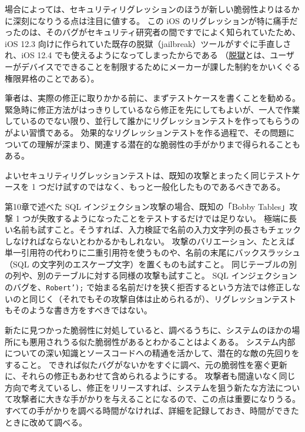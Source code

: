 \documentclass[uplatex]{jsarticle}
\def\label#1{}%
\begin{document}
場合によっては、セキュリティリグレッションのほうが新しい脆弱性よりはるかに深刻になりうる点は注目に値する。
この iOS のリグレッションが特に痛手だったのは、そのバグがセキュリティ研究者の間ですでによく知られていたため、iOS 12.3 向けに作られていた既存の脱獄（jailbreak）ツールがすぐに手直しされ、iOS 12.4 でも使えるようになってしまったからである
（\underline{脱獄}とは、ユーザーがデバイスでできることを制限するためにメーカーが課した制約をかいくぐる権限昇格のことである）。

筆者は、実際の修正に取りかかる前に、まずテストケースを書くことを勧める。
緊急時に修正方法がはっきりしているなら修正を先にしてもよいが、一人で作業しているのでない限り、並行して誰かにリグレッションテストを作ってもらうのがよい習慣である。
効果的なリグレッションテストを作る過程で、その問題についての理解が深まり、関連する潜在的な脆弱性の手がかりまで得られることもある。

よいセキュリティリグレッションテストは、既知の攻撃とまったく同じテストケースを 1 つだけ試すのではなく、もっと一般化したものであるべきである。

\begin{exa}\label{exa:ch12-sql-injection-regression}
第10章で述べた SQL インジェクション攻撃の場合、既知の「Bobby Tables」攻撃 1 つが失敗するようになったことをテストするだけでは足りない。
極端に長い名前も試すこと。そうすれば、入力検証で名前の入力文字列の長さもチェックしなければならないとわかるかもしれない。
攻撃のバリエーション、たとえば単一引用符の代わりに二重引用符を使うものや、名前の末尾にバックスラッシュ（SQL の文字列のエスケープ文字）を置くものも試すこと。
同じテーブルの別の列や、別のテーブルに対する同様の攻撃も試すこと。
SQL インジェクションのバグを、\texttt{Robert');} で始まる名前だけを狭く拒否するという方法では修正しないのと同じく（それでもその攻撃自体は止められるが）、リグレッションテストもそのような書き方をすべきではない。
\end{exa}

新たに見つかった脆弱性に対処していると、調べるうちに、システムのほかの場所にも悪用されうる似た脆弱性があるとわかることはよくある。
システム内部についての深い知識とソースコードへの精通を活かして、潜在的な敵の先回りをすること。
できれば似たバグがないかをすぐに調べ、元の脆弱性を塞ぐ更新に、それらの修正もあわせて含められるようにする。
攻撃者も間違いなく同じ方向で考えているし、修正をリリースすれば、システムを狙う新たな方法について攻撃者に大きな手がかりを与えることになるので、この点は重要になりうる。
すべての手がかりを調べる時間がなければ、詳細を記録しておき、時間ができたときに改めて調べる。
\end{document}
